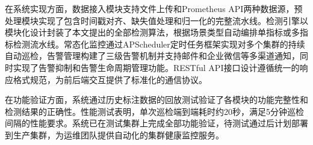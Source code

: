在系统实现方面，数据接入模块支持文件上传和Prometheus API两种数据源，预处理模块实现了包含时间戳对齐、缺失值处理和归一化的完整流水线。检测引擎以模块化设计封装了本文提出的全部检测算法，根据场景类型自动编排单指标或多指标检测流水线。常态化监控通过APScheduler定时任务框架实现对多个集群的持续自动巡检，告警管理构建了三级告警机制并支持邮件和企业微信等多渠道通知，同时实现了告警抑制和告警生命周期管理功能。RESTful API接口设计遵循统一的响应格式规范，为前后端交互提供了标准化的通信协议。

在功能验证方面，系统通过历史标注数据的回放测试验证了各模块的功能完整性和检测结果的正确性。性能测试表明，单次巡检端到端耗时约20秒，满足5分钟巡检间隔的性能要求。系统已在测试集群上完成全部功能验证，待测试通过后计划部署到生产集群，为运维团队提供自动化的集群健康监控服务。
